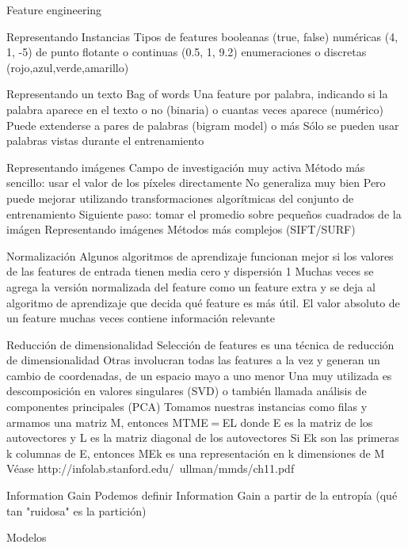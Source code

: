 Feature engineering

Representando Instancias
Tipos de features
booleanas (true, false)
numéricas (4, 1, -5)
de punto flotante o continuas (0.5, 1, 9.2)
enumeraciones o discretas (rojo,azul,verde,amarillo)

Representando un texto
Bag of words
Una feature por palabra, indicando si la palabra aparece en el texto o no (binaria) o cuantas veces aparece (numérico)
Puede extenderse a pares de palabras (bigram model) o más
Sólo se pueden usar palabras vistas durante el entrenamiento

Representando imágenes
Campo de investigación muy activa
Método más sencillo: usar el valor de los píxeles directamente
No generaliza muy bien
Pero puede mejorar utilizando transformaciones algorítmicas del conjunto de entrenamiento
Siguiente paso: tomar el promedio sobre pequeños cuadrados de la imágen
Representando imágenes
Métodos más complejos (SIFT/SURF)


Normalización
Algunos algoritmos de aprendizaje funcionan mejor si los valores de las features de entrada tienen media cero y dispersión 1
Muchas veces se agrega la versión normalizada del feature como un feature extra y se deja al algoritmo de aprendizaje que decida qué feature es más útil.
El valor absoluto de un feature muchas veces contiene información relevante

Reducción de dimensionalidad
Selección de features es una técnica de reducción de dimensionalidad
Otras involucran todas las features a la vez y generan un cambio de coordenadas, de un espacio mayo a uno menor
Una muy utilizada es descomposición en valores singulares (SVD) o también llamada análisis de componentes principales (PCA)
Tomamos nuestras instancias como filas y armamos una matriz M, entonces
MTME = EL
donde E es la matriz de los autovectores y L es la matriz diagonal de los autovectores
Si Ek son las primeras k columnas de E, entonces MEk es una representación en k dimensiones de M
Véase http://infolab.stanford.edu/~ullman/mmds/ch11.pdf


Information Gain
Podemos definir Information Gain a partir de la entropía (qué tan "ruidosa" es la partición)

Modelos

